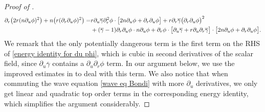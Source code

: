 \documentclass[11pt]{article}
\numberwithin{equation}{section}
\begin{document}
\begin{proof}[Proof of ]
\begin{align}
        \partial_r\big(2r(n\partial_u\phi)^2\big)+n\big(r(\partial_r\partial_u\phi)^2\big)=&r\partial_u\overline{\gamma}\partial_r^2\phi\cdot \big[2n\partial_u\phi+\partial_r\partial_u\phi\big]+ r\partial_r\overline{\gamma}\big(\partial_r\partial_u\phi\big)^2\label{energy identity for du phi}\\&+(\overline{\gamma}-1)\partial_r\partial_u\phi\cdot n\partial_u\phi+\partial_r\phi\cdot\big[\partial_u\overline{\gamma}+r\partial_u\partial_r\overline{\gamma}\big] \cdot\big[2n\partial_u\phi+\partial_r\partial_u\phi\big].\notag
    \end{align}
    We remark that the only potentially dangerous term is the first term on the RHS of \eqref{energy identity for du phi}, which is cubic in second derivatives of the scalar field, since $\partial_u\overline{\gamma}$ contains a $\partial_u\partial_r\phi$ term. In our argument below, we use the improved estimates in  to deal with this term. We also notice that when commuting the wave equation \eqref{wave eq Bondi} with more $\partial_u$ derivatives, we only get linear and quadratic top order terms in the corresponding energy identity, which simplifies the argument considerably. 


\end{proof}
\end{document}
